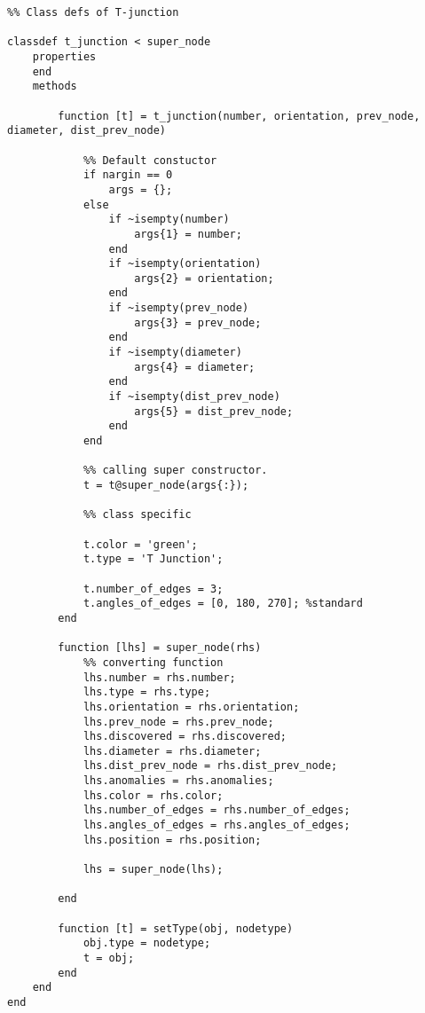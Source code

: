 \begin{lstlisting}
%% Class defs of T-junction
 
classdef t_junction < super_node
    properties    
    end
    methods
        
        function [t] = t_junction(number, orientation, prev_node, diameter, dist_prev_node)
            
            %% Default constuctor
            if nargin == 0
                args = {};
            else
                if ~isempty(number)
                    args{1} = number;
                end
                if ~isempty(orientation)
                    args{2} = orientation;
                end
                if ~isempty(prev_node)
                    args{3} = prev_node;
                end
                if ~isempty(diameter)
                    args{4} = diameter;
                end
                if ~isempty(dist_prev_node)
                    args{5} = dist_prev_node;
                end
            end
            
            %% calling super constructor.
            t = t@super_node(args{:});
            
            %% class specific
            
            t.color = 'green';
            t.type = 'T Junction';
            
            t.number_of_edges = 3;
            t.angles_of_edges = [0, 180, 270]; %standard  
        end
        
        function [lhs] = super_node(rhs)
            %% converting function
            lhs.number = rhs.number;
            lhs.type = rhs.type;
            lhs.orientation = rhs.orientation;
            lhs.prev_node = rhs.prev_node;
            lhs.discovered = rhs.discovered;
            lhs.diameter = rhs.diameter;
            lhs.dist_prev_node = rhs.dist_prev_node;
            lhs.anomalies = rhs.anomalies;
            lhs.color = rhs.color;
            lhs.number_of_edges = rhs.number_of_edges;
            lhs.angles_of_edges = rhs.angles_of_edges;
            lhs.position = rhs.position;
            
            lhs = super_node(lhs);
            
        end
        
        function [t] = setType(obj, nodetype)
            obj.type = nodetype;
            t = obj;
        end
    end
end

\end{lstlisting}


